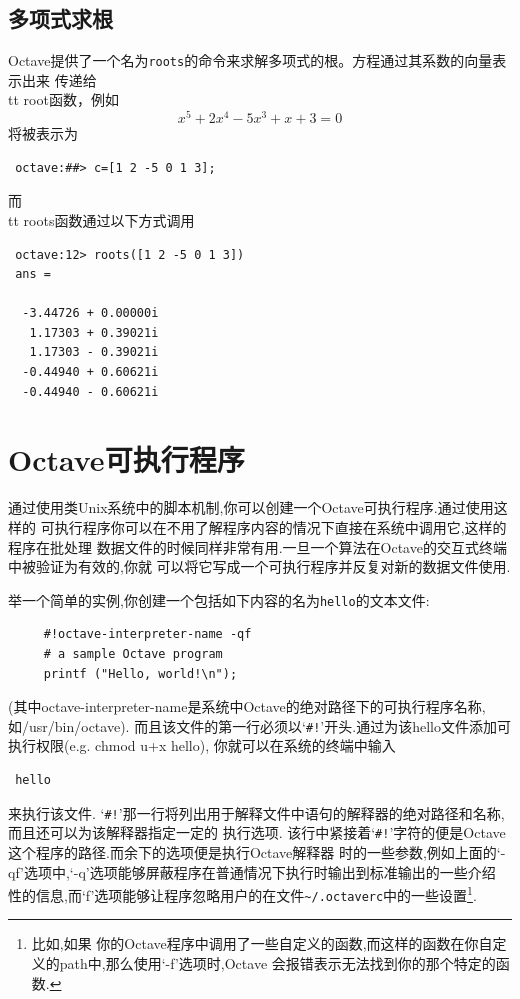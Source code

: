 \documentclass[UTF8,adobefonts]{ctexart}
\begin{document}
\subsection{多项式求根}
Octave提供了一个名为{\tt roots}的命令来求解多项式的根。方程通过其系数的向量表示出来
传递给{\\tt root}函数，例如
\begin{equation}\nonumber
 x^5+2x^4-5x^3+x+3=0
\end{equation}
将被表示为
\begin{verbatim}
 octave:##> c=[1 2 -5 0 1 3];
\end{verbatim}
而{\\tt roots}函数通过以下方式调用
\begin{verbatim}
 octave:12> roots([1 2 -5 0 1 3])
 ans =

  -3.44726 + 0.00000i
   1.17303 + 0.39021i
   1.17303 - 0.39021i
  -0.44940 + 0.60621i
  -0.44940 - 0.60621i
\end{verbatim}
\section{Octave可执行程序}
通过使用类Unix系统中的脚本机制,你可以创建一个Octave可执行程序.通过使用这样的
可执行程序你可以在不用了解程序内容的情况下直接在系统中调用它,这样的程序在批处理
数据文件的时候同样非常有用.一旦一个算法在Octave的交互式终端中被验证为有效的,你就
可以将它写成一个可执行程序并反复对新的数据文件使用.

举一个简单的实例,你创建一个包括如下内容的名为{\tt hello}的文本文件:
\begin{verbatim}
     #!octave-interpreter-name -qf
     # a sample Octave program
     printf ("Hello, world!\n");
\end{verbatim} 
(其中octave-interpreter-name是系统中Octave的绝对路径下的可执行程序名称, 如/usr/bin/octave).
而且该文件的第一行必须以`\verb+#!+'开头.通过为该hello文件添加可执行权限(e.g. chmod u+x hello),
你就可以在系统的终端中输入
\begin{verbatim}
 hello
\end{verbatim}
来执行该文件.
`\verb+#!+'那一行将列出用于解释文件中语句的解释器的绝对路径和名称,而且还可以为该解释器指定一定的
执行选项. 该行中紧接着`\verb+#!+'字符的便是Octave这个程序的路径.而余下的选项便是执行Octave解释器
时的一些参数,例如上面的`-qf'选项中,`-q'选项能够屏蔽程序在普通情况下执行时输出到标准输出的一些介绍
性的信息,而`f'选项能够让程序忽略用户的在文件\verb+~/.octaverc+中的一些设置\footnote{比如,如果
你的Octave程序中调用了一些自定义的函数,而这样的函数在你自定义的path中,那么使用`-f'选项时,Octave
会报错表示无法找到你的那个特定的函数.}.
\end{document}
